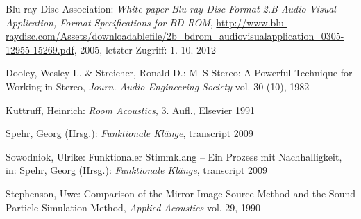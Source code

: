 \begin{thebibliography}{}

Blu-ray Disc Association: 
\emph{White paper Blu-ray Disc Format 2.B Audio Visual Application, Format Specifications for BD-ROM}, 
\url{http://www.blu-raydisc.com/Assets/downloadablefile/2b_bdrom_audiovisualapplication_0305-12955-15269.pdf}, 2005, letzter Zugriff: 1. 10. 2012

Dooley, Wesley L.  \& Streicher, Ronald D.:
\glqq M--S Stereo: A Powerful Technique for Working in Stereo\grqq, 
\emph{Journ. Audio Engineering Society} vol. 30 (10), 1982

Kuttruff, Heinrich: 
\emph{Room Acoustics}, 3. Aufl., Elsevier 1991

Spehr, Georg (Hrsg.): 
\emph{Funktionale Klänge}, transcript 2009

Sowodniok, Ulrike: 
\glqq Funktionaler Stimmklang -- Ein Prozess mit Nachhalligkeit\grqq, 
in: Spehr, Georg (Hrsg.): \emph{Funktionale Klänge}, transcript 2009

Stephenson, Uwe: 
\glqq Comparison of the Mirror Image Source Method and the Sound Particle Simulation Method\grqq, 
\emph{Applied Acoustics} vol. 29, 1990


\end{thebibliography}

\clearpage\thispagestyle{empty}
\eigen  %












